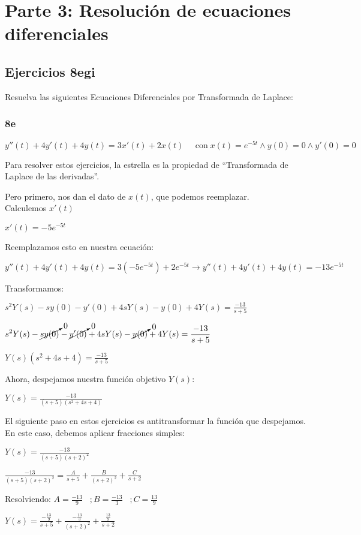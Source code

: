 \documentclass[11pt]{article}
\begin{document}
	\section{Parte 3: Resolución de ecuaciones diferenciales}
	\subsection{Ejercicios 8egi}
	Resuelva las siguientes Ecuaciones Diferenciales por Transformada de Laplace:
	\subsubsection{8e}
	$y''(t)+4y'(t)+4y(t)=3x'(t)+2x(t) \;\;\;\;\; \mathrm{con} \; x(t)=e^{-5t} \wedge y(0)=0 \wedge y'(0)=0$
	
	Para resolver estos ejercicios, la estrella es la propiedad de ``Transformada de Laplace de las derivadas''.
	
	Pero primero, nos dan el dato de $x(t)$, que podemos reemplazar.\\
	Calculemos $x'(t)$
	
	$x'(t)=-5e^{-5t}$
	
	Reemplazamos esto en nuestra ecuación:
	
	$y''(t)+4y'(t)+4y(t)=3\left(-5e^{-5t}\right)+2e^{-5t} \rightarrow \boxed{y''(t)+4y'(t)+4y(t)=-13e^{-5t}}$
	
	Transformamos:
	
	$\displaystyle s^2Y(s)-sy(0)-y'(0)+4sY(s)-y(0)+4Y(s)=\frac{-13}{s+5}$
	
	$\displaystyle s^2Y(s)-\cancelto{0}{sy(0)}-\cancelto{0}{y'(0)}+4sY(s)-\cancelto{0}{y(0)}+4Y(s)=\frac{-13}{s+5}$
	
	$\displaystyle Y(s)\left(s^2+4s+4\right)=\frac{-13}{s+5}$
	
	Ahora, despejamos nuestra función objetivo $Y(s)$:
	
	$\displaystyle Y(s)=\frac{-13}{(s+5)(s^2+4s+4)}$
	
	El siguiente paso en estos ejercicios es antitransformar la función que despejamos. En este caso, debemos aplicar fracciones simples:
	
	$\displaystyle Y(s)=\frac{-13}{(s+5)(s+2)^{2}}$
	
	$\displaystyle \frac{-13}{(s+5)(s+2)^2}=\frac{A}{s+5}+\frac{B}{(s+2)^2}+\frac{C}{s+2}$
	
	Resolviendo: $\displaystyle A=\frac{-13}{9}\;\;\;;B=\frac{-13}{3}\;\;\;;C=\frac{13}{9}\;\;\;$
	
	$\displaystyle Y(s)=\frac{-\frac{13}{9}}{s+5}+\frac{-\frac{13}{3}}{(s+2)^2}+\frac{\frac{13}{9}}{s+2}$
	
\end{document}
